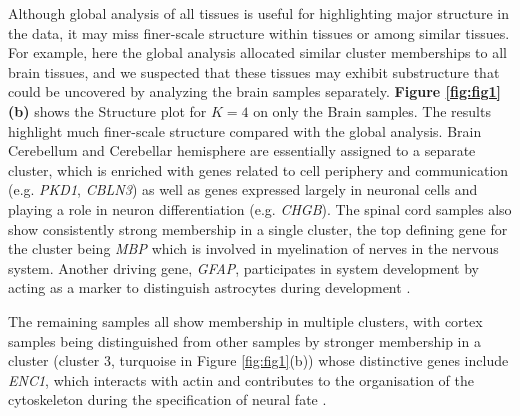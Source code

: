 Although global analysis of all tissues is useful for highlighting major structure in the data, it may miss finer-scale structure within tissues or among similar tissues. For example, here the global analysis allocated similar cluster memberships to all brain tissues,  and we suspected that these tissues may exhibit substructure that could be uncovered by analyzing the brain samples separately.  \textbf{Figure \ref{fig:fig1}(b)} shows the Structure plot for $K=4$ on only the Brain samples. The results highlight much finer-scale structure compared with the global analysis. Brain Cerebellum and Cerebellar hemisphere are essentially assigned to a separate cluster, which is enriched with genes related to cell periphery and communication (e.g. \textit{PKD1}, \textit{CBLN3}) as well as genes expressed largely in neuronal cells and playing a role in neuron differentiation (e.g. \textit{CHGB}). The spinal cord samples also show consistently strong membership in a single cluster, the top defining gene for the cluster being \textit{MBP} which is involved in myelination of nerves in the nervous system\cite{Hu2016}.  Another driving gene, \textit{GFAP}, participates in system development by acting as a marker to distinguish astrocytes during development \cite{Baba1997}. 



The remaining samples all show membership in multiple clusters, with cortex samples being distinguished from other samples by stronger membership in a cluster (cluster 3, turquoise in Figure \ref{fig:fig1}(b)) whose distinctive genes include \textit{ENC1}, which  interacts with actin and contributes to the organisation of the cytoskeleton during the specification of neural fate \cite{Hernandez1997}.



